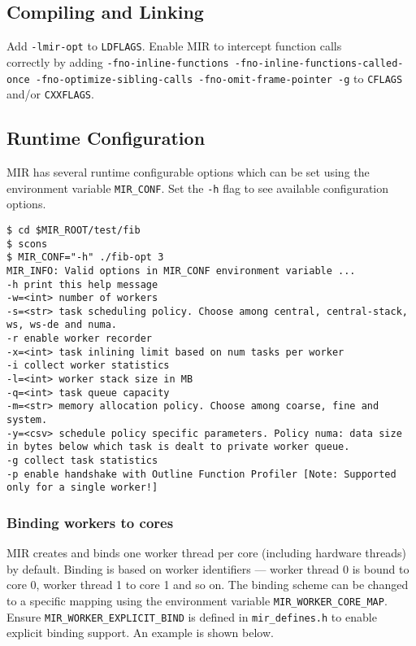 \documentclass[11pt,a4paper]{article}
\begin{document}
\subsection{Compiling and Linking}\label{compiling-and-linking}

Add \lstinline!-lmir-opt! to \lstinline!LDFLAGS!. Enable MIR to intercept function calls\\correctly by adding \lstinline!-fno-inline-functions -fno-inline-functions-called-once -fno-optimize-sibling-calls -fno-omit-frame-pointer -g!  to \lstinline!CFLAGS! and/or \lstinline!CXXFLAGS!.

\subsection{Runtime Configuration}\label{runtime-configuration}

MIR has several runtime configurable options which can be set using the environment variable \lstinline!MIR_CONF!. Set the \lstinline!-h! flag to see available configuration options.

\begin{lstlisting}[style=MyInputStyle]
$ cd $MIR_ROOT/test/fib
$ scons 
$ MIR_CONF="-h" ./fib-opt 3
MIR_INFO: Valid options in MIR_CONF environment variable ...
-h print this help message
-w=<int> number of workers
-s=<str> task scheduling policy. Choose among central, central-stack, ws, ws-de and numa.
-r enable worker recorder
-x=<int> task inlining limit based on num tasks per worker
-i collect worker statistics
-l=<int> worker stack size in MB
-q=<int> task queue capacity
-m=<str> memory allocation policy. Choose among coarse, fine and system.
-y=<csv> schedule policy specific parameters. Policy numa: data size in bytes below which task is dealt to private worker queue.
-g collect task statistics
-p enable handshake with Outline Function Profiler [Note: Supported only for a single worker!]
\end{lstlisting}

\subsubsection{Binding workers to cores}\label{binding-workers-to-cores}

MIR creates and binds one worker thread per core (including hardware threads) by default. Binding is based on worker identifiers --- worker thread 0 is bound to core 0, worker thread 1 to core 1 and so on. The binding scheme can be changed to a specific mapping using the environment variable \lstinline!MIR_WORKER_CORE_MAP!. Ensure \lstinline!MIR_WORKER_EXPLICIT_BIND! is defined in \lstinline!mir_defines.h! to enable explicit binding support. An example is shown below.
\end{document}

